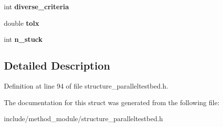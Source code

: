 \begin{DoxyCompactItemize}
\item 
\hypertarget{structglobal__options_a1254ebbca92989c59ac3deb3eaf41e82}{int {\bfseries diverse\-\_\-criteria}}\label{structglobal__options_a1254ebbca92989c59ac3deb3eaf41e82}

\item 
\hypertarget{structglobal__options_a4d4d1584c47187ddfd7c88bd54289889}{double {\bfseries tolx}}\label{structglobal__options_a4d4d1584c47187ddfd7c88bd54289889}

\item 
\hypertarget{structglobal__options_ad005f25b2115f5dc5fea6026dbdafd1b}{int {\bfseries n\-\_\-stuck}}\label{structglobal__options_ad005f25b2115f5dc5fea6026dbdafd1b}

\end{DoxyCompactItemize}


\subsection{Detailed Description}


Definition at line 94 of file structure\-\_\-paralleltestbed.\-h.



The documentation for this struct was generated from the following file\-:\begin{DoxyCompactItemize}
\item 
include/method\-\_\-module/structure\-\_\-paralleltestbed.\-h\end{DoxyCompactItemize}

